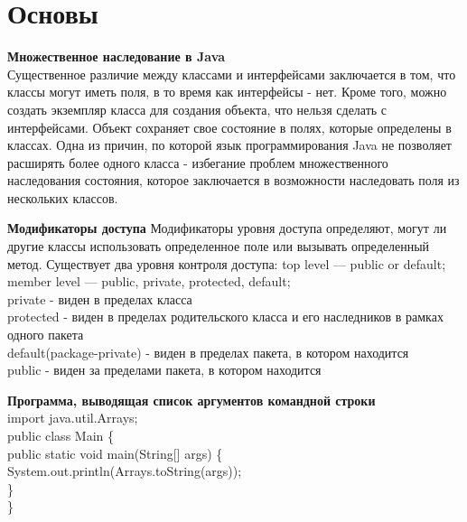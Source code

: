 \documentclass{article}
\begin{document}
\section{Основы}
\tiny
\begin{minipage}{.3\textwidth}
    \textbf{Множественное наследование в Java}\\
    Существенное различие между классами и интерфейсами заключается в том, 
    что классы могут иметь поля, в то время как интерфейсы - нет. 
    Кроме того, можно создать экземпляр класса для создания объекта, что нельзя 
    сделать с интерфейсами. Объект сохраняет свое состояние в полях, которые определены в классах. 
    Одна из причин, по которой язык программирования Java не позволяет расширять более одного класса - 
    избегание проблем множественного наследования состояния, которое заключается в 
    возможности наследовать поля из нескольких классов.
\end{minipage}
\hfill
\begin{minipage}{.3\textwidth}
    \textbf{Модификаторы доступа}
    Модификаторы уровня доступа определяют, могут ли другие классы использовать определенное поле или вызывать определенный метод.
    Существует два уровня контроля доступа: top level — public or default; member level — public, private, protected, default;\\
    private - виден в пределах класса\\
    protected - виден в пределах родительского класса и его наследников в рамках одного пакета\\
    default(package-private) - виден в пределах пакета, в котором находится\\
    public - виден за пределами пакета, в котором находится\\
\end{minipage}
\hfill
\begin{minipage}{.3\textwidth}
    \textbf{Программа, выводящая список аргументов командной строки}\\
    import java.util.Arrays;
\\
    public class Main \{\\
        public static void main(String[] args) \{\\
            System.out.println(Arrays.toString(args));\\
        \}\\
    \}
    
\end{minipage}
\\ \\
\end{document}
